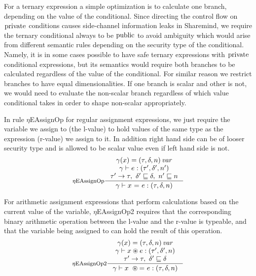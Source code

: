 \documentclass[a4paper, 10pt, draft]{report}
\newcommand{\mycode}[1]{\ensuremath{\mbox{\lstinline{#1}}}}
\begin{document}
For a ternary expression a simple optimization is to calculate one branch,
depending on the value of the conditional. Since directing the control flow on
\mycode{private} conditions causes side-channel information leaks in Sharemind,
we require the ternary conditional always to be \mycode{public} to avoid
ambiguity which would arise from different semantic rules depending on the
security type of the conditional. Namely, it is in some cases possible to have
safe ternary expressions with \mycode{private} conditional expressions, but its
semantics would require both branches to be calculated regardless of the value
of the conditional. For similar reason we restrict branches to have equal
dimensionalities. If one branch is scalar and other is not, we would need to
evaluate the non-scalar branch regardless of which value conditional takes in
order to shape non-scalar appropriately.

In rule $\eta$EAssignOp for regular assignment expressions, we just require the
variable we assign to (the l-value) to hold values of the same type as the
expression (r-value) we assign to it. In addition right hand side can be of
looser security type and is allowed to be scalar value even if left hand side
is not.
\[ \inference[$\eta$EAssignOp]
{
  \gamma(x) = \left(\tau, \delta, n \right) \mathit{var} \\
  \gamma |- e : \left(\tau', \delta', n'\right) \\
  \tau' \to \tau,\ \delta' \sqsubseteq \delta,\ n' \sqsubseteq n
}
{
  \gamma |- x\ \mycode{=}\ e : \left(\tau, \delta, n\right)
} \]

For arithmetic assignment expressions that perform calculations based on the
current value of the variable, $\eta$EAssignOp2 requires that the corresponding
binary arithmetic operation between the l-value and the r-value is typeable,
and that the variable being assigned to can hold the result of this operation.
\[ \inference[$\eta$EAssignOp2]
{
  \gamma(x) = \left(\tau, \delta, n\right) \mathit{var} \\
  \gamma |- x \circledast e : \left(\tau', \delta', n\right) \\
  \tau' \to \tau,\ \delta' \sqsubseteq \delta
}
{
  \gamma |- x\  \circledast \mycode{=}\ e : \left(\tau, \delta, n\right)
} \]
\end{document}

